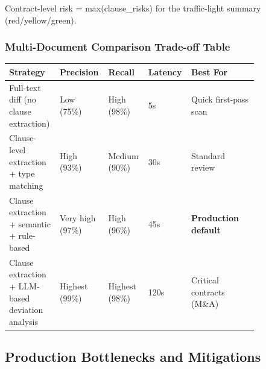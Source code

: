 Contract-level risk = max(clause\_risks) for the traffic-light summary (red/yellow/green).

\subsubsection*{Multi-Document Comparison Trade-off Table}

\begin{tabular}{|p{0.18\linewidth}|p{0.14\linewidth}|p{0.14\linewidth}|p{0.10\linewidth}|p{0.26\linewidth}|}
\hline
\textbf{Strategy} & \textbf{Precision} & \textbf{Recall} & \textbf{Latency} & \textbf{Best For} \\
\hline
Full-text diff (no clause extraction) & Low (75\%) & High (98\%) & 5s & Quick first-pass scan \\
\hline
Clause-level extraction + type matching & High (93\%) & Medium (90\%) & 30s & Standard review \\
\hline
Clause extraction + semantic + rule-based & Very high (97\%) & High (96\%) & 45s & \textbf{Production default} \\
\hline
Clause extraction + LLM-based deviation analysis & Highest (99\%) & Highest (98\%) & 120s & Critical contracts (M\&A) \\
\hline
\end{tabular}

\subsection*{Production Bottlenecks and Mitigations}

